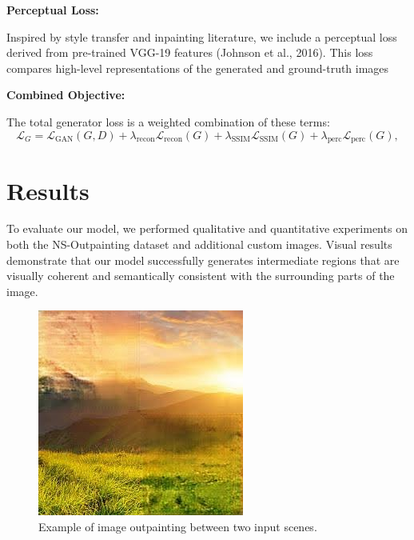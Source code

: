 \documentclass[sigconf]{acmart}
\begin{document}
\textbf{Perceptual Loss:}

Inspired by style transfer and inpainting literature, we include a perceptual loss derived from pre-trained VGG-19 features (Johnson et al., 2016). This loss compares high-level representations of the generated and ground-truth images

\textbf{Combined Objective:}

The total generator loss is a weighted combination of these terms:
\[
\mathcal{L}_{G} = \mathcal{L}_{\text{GAN}}(G,D) + \lambda_{\text{recon}}\mathcal{L}_{\text{recon}}(G) + \lambda_{\text{SSIM}}\mathcal{L}_{\text{SSIM}}(G) + \lambda_{\text{perc}}\mathcal{L}_{\text{perc}}(G),
\]

\section*{Results}
To evaluate our model, we performed qualitative and quantitative experiments on both the NS-Outpainting dataset and additional custom images. Visual results demonstrate that our model successfully generates intermediate regions that are visually coherent and semantically consistent with the surrounding parts of the image.

\begin{figure}[h!]
    \centering
    \includegraphics[width=\linewidth]{output1.jpg}
    \caption{Example of image outpainting between two input scenes.}
    \label{fig:output1}
\end{figure}
\end{document}
